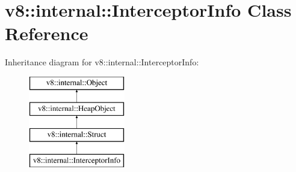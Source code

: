 \hypertarget{classv8_1_1internal_1_1_interceptor_info}{}\section{v8\+:\+:internal\+:\+:Interceptor\+Info Class Reference}
\label{classv8_1_1internal_1_1_interceptor_info}
Inheritance diagram for v8\+:\+:internal\+:\+:Interceptor\+Info\+:\begin{figure}[H]
\begin{center}
\leavevmode
\includegraphics[height=4.000000cm]{classv8_1_1internal_1_1_interceptor_info}
\end{center}
\end{figure}
